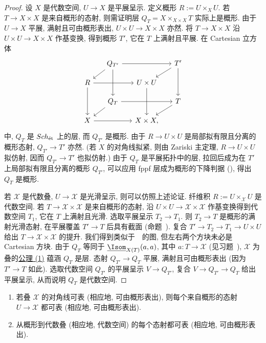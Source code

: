 \begin{proof}
设 $X$ 是代数空间, $U\to X$ 是平展呈示. 定义概形 $R:=U\times_X U$. 若 $T\to X\times X$ 是来自概形的态射, 则需证明层 $Q_T=X\times_{X\times X}T$ 实际上是概形. 由于 $U\to X$ 平展, 满射且可由概形表出, $U\times U\to X\times X$ 亦然. 将 $T\to X\times X$ 沿 $U\times U\to X\times X$ 作基变换, 得到概形 $T'$, 它在 $T$ 上满射且平展. 在 Cartesian 立方体
\begin{equation}\label{src:4.2.2}
\begin{tikzcd}[row sep=1.1em,column sep=1.4em]
{}&Q_{T'}\arrow[rr]\arrow[dl]\arrow[dd]&{}&T'\arrow[dl]\arrow[dd]\\
R\arrow[rr]\arrow[dd]&{}&U\times U\arrow[dd]&{}\\
{}&Q_T\arrow[rr]\arrow[dl]&{}&T\arrow[dl]\\
X\arrow[rr]&{}&X\times X,&{}
\end{tikzcd}
\end{equation}
中, $Q_T$ 是 $Sch_{\text{ét}}$ 上的层, 而 $Q_{T'}$ 是概形. 由于 $R\to U\times U$ 是局部拟有限且分离的概形态射, $Q_{T'}\to T'$ 亦然. (若 $X$ 的对角线拟紧, 则由 Zariski 主定理, $R\to U\times U$ 拟仿射, 因而 $Q_{T'}\to T'$ 也拟仿射.) 由于 $Q_T$ 是平展拓扑中的层, 拉回后成为在 $T'$ 上局部拟有限且分离的概形 $Q_{T'}$, 可以应用 fppf 层成为概形的下降判据 (), 得出 $Q_T$ 是概形.

若 $\mathcal X$ 是代数叠, $U\to\mathcal X$ 是光滑呈示, 则可以仿照上述论证. 纤维积 $R:=U\times_{\mathcal X}U$ 是代数空间. 若 $T\to\mathcal X\times\mathcal X$ 是来自概形的态射, 沿 $U\times U\to\mathcal X\times\mathcal X$ 作基变换得到代数空间 $T_1$, 它在 $T$ 上满射且光滑. 选取平展呈示 $T_2\to T_1$. 则 $T_2\to T$ 是概形的满射光滑态射, 在平展覆盖 $T'\to T$ 后具有截面 (命题~). 复合 $T'\to T_2\to T_1\to U\times U$ 给出 $T\to\mathcal X\times\mathcal X$ 的提升. 我们得到类似于~~的图, 但左右两个方块未必是 Cartesian 方块. 由于 $Q_T$ 等同于 $\underline{\Isom}_{\mathcal X(T)}(a,a)$, 其中 $a:T\to\mathcal X$ (见习题~), $\mathcal X$ 为叠的\hyperlink{stack-axiom-1}{公理 (1)} 蕴涵 $Q_T$ 是层. 态射 $Q_{T'}\to Q_T$ 平展, 满射且可由概形表出 (因为 $T'\to T$ 如此). 选取代数空间 $Q_{T'}$ 的平展呈示 $V\to Q_{T'}$, 复合 $V\to Q_{T'}\to Q_T$ 给出平展呈示, 从而说明 $Q_T$ 是代数空间.
\end{proof}
\begin{corollary}\label{src:4.2.3}
\begin{enumerate}[(1)]
\item 若叠 $\mathcal X$ 的对角线可表 (相应地, 可由概形表出), 则每个来自概形的态射 $U\to\mathcal X$ 都可表 (相应地, 可由概形表出).
\item 从概形到代数叠 (相应地, 代数空间) 的每个态射都可表 (相应地, 可由概形表出).
\end{enumerate}
\end{corollary}
